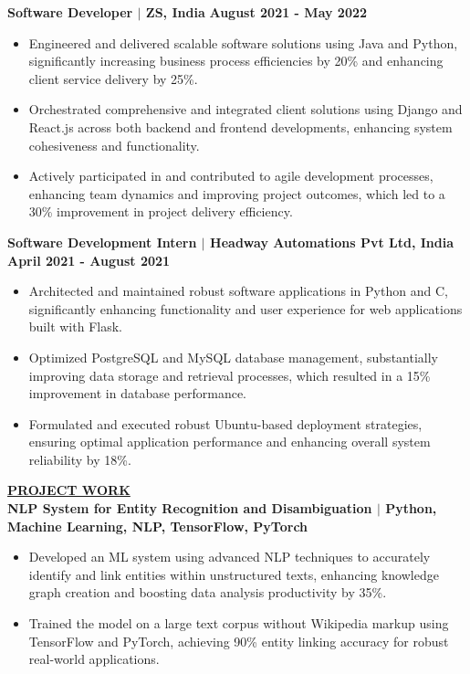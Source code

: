 \documentclass{article}
\begin{document}
\noindent \textbf{Software Developer $\mid$ ZS, India} \hfill \textbf{August 2021 - May 2022}
\begin{itemize}[noitemsep,nolistsep,leftmargin=*]
\item {\small Engineered and delivered scalable software solutions using Java and Python, significantly increasing business process efficiencies by 20\% and enhancing client service delivery by 25\%.}
\item {\small Orchestrated comprehensive and integrated client solutions using Django and React.js across both backend and frontend developments, enhancing system cohesiveness and functionality.}
\item {\small Actively participated in and contributed to agile development processes, enhancing team dynamics and improving project outcomes, which led to a 30\% improvement in project delivery efficiency.}\\
\end{itemize}

\noindent \textbf{Software Development Intern $\mid$ Headway Automations Pvt Ltd, India} \hfill \textbf{April 2021 - August 2021}
\begin{itemize}[noitemsep,nolistsep,leftmargin=*]
\item {\small Architected and maintained robust software applications in Python and C, significantly enhancing functionality and user experience for web applications built with Flask.}
\item {\small Optimized PostgreSQL and MySQL database management, substantially improving data storage and retrieval processes, which resulted in a 15\% improvement in database performance.}
\item {\small Formulated and executed robust Ubuntu-based deployment strategies, ensuring optimal application performance and enhancing overall system reliability by 18\%.}\\
\end{itemize}


\noindent \textbf{\underline{PROJECT WORK}} \\
\noindent \textbf{NLP System for Entity Recognition and Disambiguation $\mid$ {\small Python, Machine Learning, NLP, TensorFlow, PyTorch}}
\begin{itemize}[noitemsep,nolistsep,leftmargin=*]
\item {\small Developed an ML system using advanced NLP techniques to accurately identify and link entities within unstructured texts, enhancing knowledge graph creation and boosting data analysis productivity by 35\%.}
\item {\small Trained the model on a large text corpus without Wikipedia markup using TensorFlow and PyTorch, achieving 90\% entity linking accuracy for robust real-world applications.}\\
\end{itemize}
\end{document}
